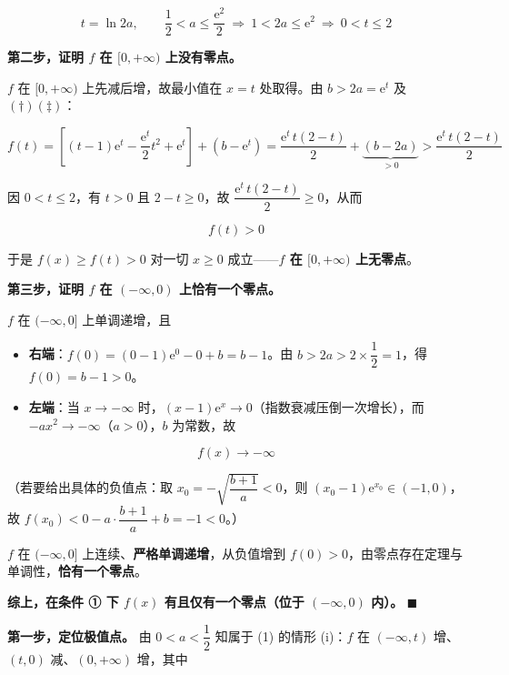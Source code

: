 \begin{answer}
\nopagebreak[4]
\[t=\ln2a,\qquad \frac12<a\le\frac{\mathrm e^{2}}2\ \Longrightarrow\ 1<2a\le\mathrm e^{2}\ \Longrightarrow\ 0<t\le2\]

\textbf{第二步，证明 $f$ 在 $[0,+\infty)$ 上没有零点。}

$f$ 在 $[0,+\infty)$ 上先减后增，故最小值在 $x=t$ 处取得。由 $b>2a=\mathrm e^{t}$ 及 $(\dagger)(\ddagger)$：

\nopagebreak[4]
\[f(t)=\left[(t-1)\mathrm e^{t}-\frac{\mathrm e^{t}}2t^{2}+\mathrm e^{t}\right]+\left(b-\mathrm e^{t}\right)=\frac{\mathrm e^{t}\,t(2-t)}2+\underbrace{\left(b-2a\right)}_{>0}>\frac{\mathrm e^{t}\,t(2-t)}2\]

因 $0<t\le2$，有 $t>0$ 且 $2-t\ge0$，故 $\dfrac{\mathrm e^{t}\,t(2-t)}2\ge0$，从而

\nopagebreak[4]
\[f(t)>0\]

于是 $f(x)\ge f(t)>0$ 对一切 $x\ge0$ 成立——\textbf{$f$ 在 $[0,+\infty)$ 上无零点}。

\textbf{第三步，证明 $f$ 在 $(-\infty,0)$ 上恰有一个零点。}

$f$ 在 $(-\infty,0]$ 上单调递增，且

\begin{itemize}
\item \textbf{右端}：$f(0)=(0-1)\mathrm e^{0}-0+b=b-1$。由 $b>2a>2\times\dfrac12=1$，得 $f(0)=b-1>0$。
\item \textbf{左端}：当 $x\to-\infty$ 时，$(x-1)\mathrm e^{x}\to0$（指数衰减压倒一次增长），而 $-ax^{2}\to-\infty$（$a>0$），$b$ 为常数，故
\end{itemize}

\nopagebreak[4]
\[f(x)\to-\infty\]

（若要给出具体的负值点：取 $x_0=-\sqrt{\dfrac{b+1}a}<0$，则 $(x_0-1)\mathrm e^{x_0}\in(-1,0)$，故 $f\left(x_0\right)<0-a\cdot\dfrac{b+1}a+b=-1<0$。）

$f$ 在 $(-\infty,0]$ 上连续、\textbf{严格单调递增}，从负值增到 $f(0)>0$，由零点存在定理与单调性，\textbf{恰有一个零点}。

\textbf{综上，在条件 ① 下 $f(x)$ 有且仅有一个零点（位于 $(-\infty,0)$ 内）。} $\blacksquare$

\par\medskip


\textbf{第一步，定位极值点。} 由 $0<a<\dfrac12$ 知属于 (1) 的情形 (i)：$f$ 在 $(-\infty,t)$ 增、$(t,0)$ 减、$(0,+\infty)$ 增，其中


\end{answer}
